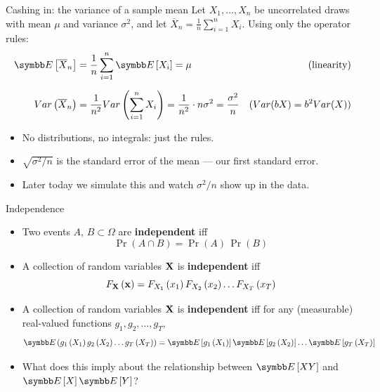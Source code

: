 \documentclass[aspectratio=169,11pt]{beamer}
\begin{document}
\begin{frame}{Cashing in: the variance of a sample mean}
Let $X_1,\dots,X_n$ be uncorrelated draws with mean $\mu$ and variance $\sigma^2$, and let
$\overline{X}_n = \frac{1}{n}\sum_{i=1}^n X_i$. Using \alert{only the operator rules}:
\begin{align*}
	\E\left[\overline{X}_n\right] &= \frac{1}{n}\sum_{i=1}^n \E\left[X_i\right] = \mu
	& \text{(linearity)}\\[6pt]
	Var\left(\overline{X}_n\right) &= \frac{1}{n^2} Var\left(\sum_{i=1}^n X_i\right) = \frac{1}{n^2} \cdot n\sigma^2 = \frac{\sigma^2}{n}
	& \text{(} Var(bX) = b^2 Var(X) \text{)}
\end{align*}
\begin{itemize}
	\item No distributions, no integrals: just the rules.
	\item $\sqrt{\sigma^2/n}$ is the \alert{standard error} of the mean --- our first standard error.
	\item Later today we simulate this and watch $\sigma^2/n$ show up in the data.
\end{itemize}
\end{frame}



\begin{frame}{Independence}
\begin{itemize}
	\item Two events $A$, $B \subset \Omega$  are {\bf independent} iff\[
		\Pr\left(A\cap B\right) = \Pr\left( A\right)\, \Pr\left( B\right)
	\]
	
	\medskip
	\item A collection of random variables ${\bf X}$ is {\bf independent} iff\[
		F_{{\bf X}} \left({\bf x}\right) = F_{X_1}\left(x_1\right) F_{X_2}\left(x_2\right) \dots F_{X_T}\left(x_T\right) 
	\]
	
		\medskip
	\item A collection of random variables ${\bf X}$ is {\bf independent} iff for any (measurable) real-valued functions $g_1,g_2,\dots,g_T$, \[
		\E \left(g_1\left(X_1\right)g_2\left(X_2\right)\dots g_T\left(X_T\right)\right) = \E\left[g_1\left(X_1\right)\right] \E\left[g_2\left(X_2\right)\right] \dots \E\left[g_T\left(X_T\right)\right]
	\]
	
	
	\medskip
	\item What does this imply about the relationship between $\E\left[X Y\right]$ and $\E\left[X\right] \E\left[Y\right]$? 
			
\end{itemize}
\end{frame}
\end{document}
